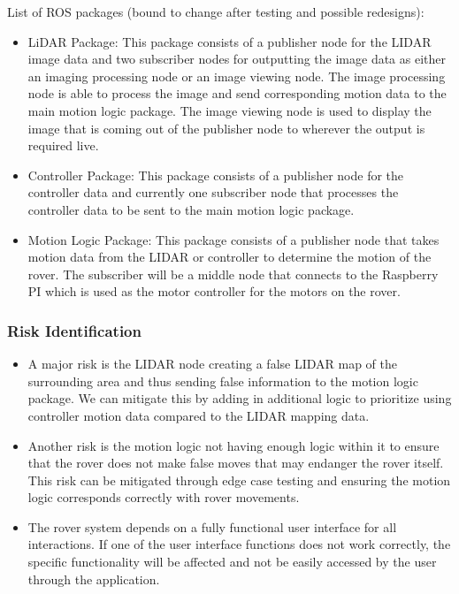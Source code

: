 \documentclass[a4paper, 10pt]{article}
\begin{document}
		List of ROS packages (bound to change after testing and possible redesigns):
			\begin{itemize}
				\item{LiDAR Package:}
				This package consists of a publisher node for the LIDAR image data and two subscriber nodes for outputting the image data as either an imaging processing node or an image viewing node. The image processing node is able to process the image and send corresponding motion data to the main motion logic package. The image viewing node is used to display the image that is coming out of the publisher node to wherever the output is required live.
			
				\item{Controller Package:}
				This package consists of a publisher node for the controller data and currently one subscriber node that processes the controller data to be sent to the main motion logic package.
			
				\item{Motion Logic Package:}
				This package consists of a publisher node that takes motion data from the LIDAR or controller to determine the motion of the rover. The subscriber will be a middle node that connects to the Raspberry PI which is used as the motor controller for the motors on the rover.
			\end{itemize}

		\subsubsection*{Risk Identification} 
			\begin{itemize}
				\item
				A major risk is the LIDAR node creating a false LIDAR map of the surrounding area and thus sending false information to the motion logic package. We can mitigate this by adding in additional logic to prioritize using controller motion data compared to the LIDAR mapping data. 

				\item
				Another risk is the motion logic not having enough logic within it to ensure that the rover does not make false moves that may endanger the rover itself. This risk can be mitigated through edge case testing and ensuring the motion logic corresponds correctly with rover movements. 

				\item
				The rover system depends on a fully functional user interface for all interactions. If one of the user interface functions does not work correctly, the specific functionality will be affected and not be easily accessed by the user through the application. 
			\end{itemize}
 		
\end{document}
